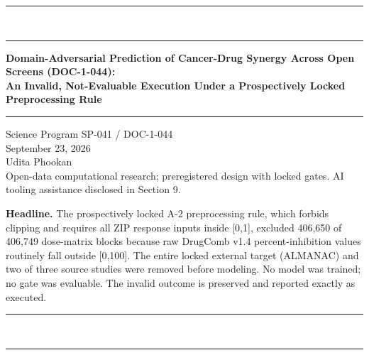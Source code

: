 \documentclass[11pt,letterpaper]{article}
\begin{document}
\thispagestyle{empty}
\begin{center}
\vspace*{30pt}
{\color{navy}\rule{\textwidth}{1.5pt}}\\[2pt]
{\color{navy}\rule{\textwidth}{0.5pt}}

\vspace{26pt}
{\color{navy}\Large\bfseries Domain-Adversarial Prediction of Cancer-Drug Synergy Across Open Screens (DOC-1-044):}\\[10pt]
{\color{navy}\large\bfseries An Invalid, Not-Evaluable Execution Under a Prospectively Locked Preprocessing Rule}\\[8pt]
{\color{navy}\rule{0.6\textwidth}{0.5pt}}

\vspace{22pt}
{\normalsize Science Program \quad SP-041 / DOC-1-044}\\[4pt]
{\normalsize September 23, 2026}\\[4pt]
{\normalsize Udita Phookan}\\[2pt]
{\small Open-data computational research; preregistered design with locked gates. AI tooling assistance disclosed in Section 9.}

\vspace{26pt}

\vspace{24pt}
\begin{minipage}{0.85\textwidth}
\centering\small
\textbf{Headline.} The prospectively locked A-2 preprocessing rule, which forbids clipping and requires all ZIP response inputs inside [0,1], excluded 406,650 of 406,749 dose-matrix blocks because raw DrugComb v1.4 percent-inhibition values routinely fall outside [0,100]. The entire locked external target (ALMANAC) and two of three source studies were removed before modeling. No model was trained; no gate was evaluable. The invalid outcome is preserved and reported exactly as executed.
\end{minipage}

\vspace{20pt}
{\color{navy}\rule{\textwidth}{0.5pt}}\\[2pt]
{\color{navy}\rule{\textwidth}{1.5pt}}
\end{center}
\clearpage
\end{document}

